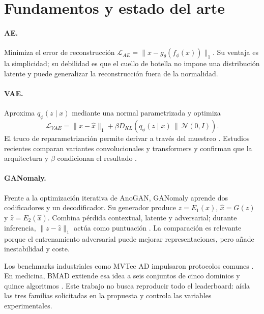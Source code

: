 \section{Fundamentos y estado del arte}

\paragraph{AE.} Minimiza el error de reconstrucción
$\mathcal{L}_{AE}=\lVert x-g_\theta(f_\phi(x))\rVert_1$. Su ventaja es la
simplicidad; su debilidad es que el cuello de botella no impone una distribución
latente y puede generalizar la reconstrucción fuera de la normalidad.

\paragraph{VAE.} Aproxima $q_\phi(z\mid x)$ mediante una normal parametrizada y
optimiza
\[
\mathcal{L}_{VAE}=\lVert x-\hat{x}\rVert_1+
\beta D_{KL}\!\left(q_\phi(z\mid x)\,\|\,\mathcal{N}(0,I)\right).
\]
El truco de reparametrización permite derivar a través del muestreo
\cite{kingma2014vae}. Estudios recientes comparan variantes convolucionales y
transformers y confirman que la arquitectura y $\beta$ condicionan el resultado
\cite{nguyen2024vae}.

\paragraph{GANomaly.} Frente a la optimización iterativa de AnoGAN, GANomaly
aprende dos codificadores y un decodificador. Su generador produce
$z=E_1(x)$, $\hat{x}=G(z)$ y $\hat{z}=E_2(\hat{x})$. Combina pérdida contextual,
latente y adversarial; durante inferencia, $\lVert z-\hat{z}\rVert_1$ actúa como
puntuación \cite{akcay2019ganomaly}. La comparación es relevante porque el
entrenamiento adversarial puede mejorar representaciones, pero añade
inestabilidad y coste.

Los benchmarks industriales como MVTec AD impulsaron protocolos comunes
\cite{bergmann2019mvtec}. En medicina, BMAD extiende esa idea a seis conjuntos
de cinco dominios y quince algoritmos \cite{bao2024bmad}. Este trabajo no busca
reproducir todo el leaderboard: aísla las tres familias solicitadas en la
propuesta y controla las variables experimentales.

